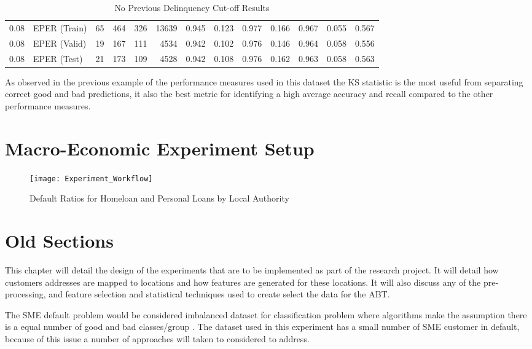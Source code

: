 \begin{table}[H]
{\begin{tabular}{l|l|r|r|r|r|r|r|r|r|r|r|r}
			0.08            & EPER (Train)    & 65          & 464         & 326         & 13639       & 0.945             & 0.123              & 0.977        & 0.166           & 0.967                & 0.055  & 0.567     \\
			0.08            & EPER (Valid)    & 19          & 167         & 111         & 4534        & 0.942             & \cellcolor{yellow!25}0.102              & 0.976        & 0.146           & 0.964                & 0.058    & 0.556   \\
			0.08            & EPER (Test)     & 21          & 173         & 109         & 4528        & 0.942             & 0.108              & 0.976        & 0.162           & 0.963                & 0.058 & 0.563     \\ \hline
		\end{tabular}
	}
	\caption{No Previous Delinquency Cut-off Results}
	\label{table:NoDelinquencyModelCutoff}
\end{table}

As observed in the previous example of the performance measures used in this dataset the KS statistic is the most useful from separating correct good and bad predictions, it also the best metric for identifying a high average accuracy and recall compared to the other performance measures. 


\section{Macro-Economic Experiment Setup }

\begin{figure}[H]
	\texttt{[image: Experiment\_Workflow]}
	\caption{Default Ratios for Homeloan and Personal Loans by Local Authority}
	\label{fig:Experiment_Workflow}
\end{figure}


\pagebreak


\section{Old Sections}
This chapter will detail the design of the experiments that are to be implemented as part of the research project. It will detail how customers addresses are mapped to locations and how features are generated for these locations. It will also discuss any of the pre-processing, and feature selection and statistical techniques used to create select the data for the ABT.

The SME default problem would be considered imbalanced dataset for classification problem where algorithms make the assumption there is a equal number of good and bad classes/group \citep{japkowicz_class_2000}. The dataset used in this experiment has a small number of SME customer in default, because of this issue a number of approaches will taken to considered to address.

